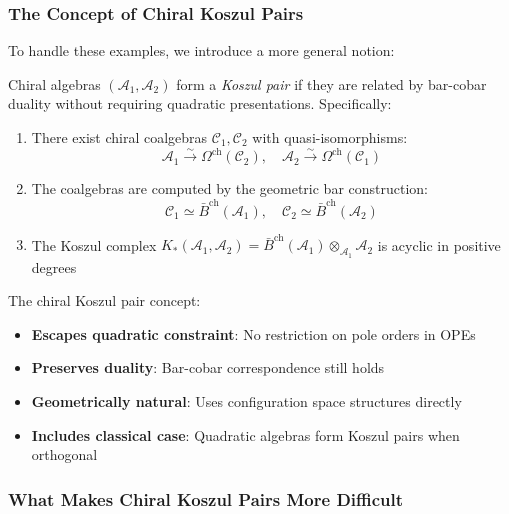 \subsubsection{The Concept of Chiral Koszul Pairs}

To handle these examples, we introduce a more general notion:

\begin{definition}
Chiral algebras $(\mathcal{A}_1, \mathcal{A}_2)$ form a \emph{Koszul pair} if they are related by bar-cobar duality without requiring quadratic presentations. Specifically:
\begin{enumerate}
\item There exist chiral coalgebras $\mathcal{C}_1, \mathcal{C}_2$ with quasi-isomorphisms:
$$\mathcal{A}_1 \xrightarrow{\sim} \Omega^{\text{ch}}(\mathcal{C}_2), \quad \mathcal{A}_2 \xrightarrow{\sim} \Omega^{\text{ch}}(\mathcal{C}_1)$$

\item The coalgebras are computed by the geometric bar construction:
$$\mathcal{C}_1 \simeq \bar{B}^{\text{ch}}(\mathcal{A}_1), \quad \mathcal{C}_2 \simeq \bar{B}^{\text{ch}}(\mathcal{A}_2)$$

\item The Koszul complex $K_*(\mathcal{A}_1, \mathcal{A}_2) = \bar{B}^{\text{ch}}(\mathcal{A}_1) \otimes_{\mathcal{A}_1} \mathcal{A}_2$ is acyclic in positive degrees
\end{enumerate}
\end{definition}

\begin{remark}
The chiral Koszul pair concept:
\begin{itemize}
\item \textbf{Escapes quadratic constraint}: No restriction on pole orders in OPEs
\item \textbf{Preserves duality}: Bar-cobar correspondence still holds
\item \textbf{Geometrically natural}: Uses configuration space structures directly
\item \textbf{Includes classical case}: Quadratic algebras form Koszul pairs when orthogonal
\end{itemize}
\end{remark}

\subsubsection{What Makes Chiral Koszul Pairs More Difficult}

